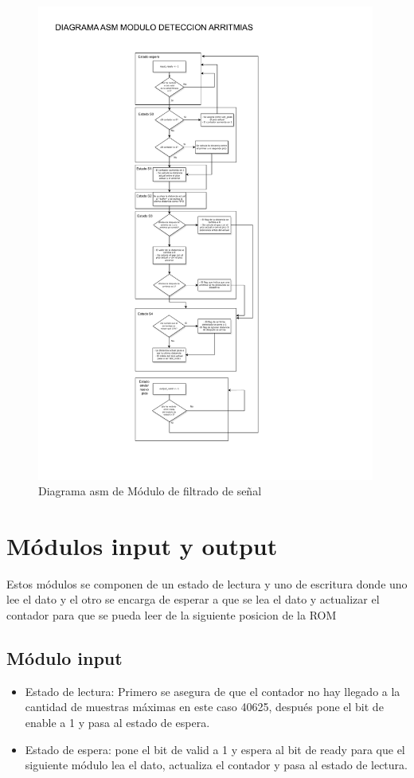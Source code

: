 \begin{figure}[h!]
    \centering
    \includegraphics[width=0.99\textwidth]{./Images/img_implementacion_hw/Diagramaasmarritmias.pdf}
    \caption{Diagrama asm de Módulo de filtrado de señal}
    \label{fig:Diagramaasmarritmias}
\end{figure} 

\section {Módulos input y output}
Estos módulos se componen de un estado de lectura y uno de escritura donde uno lee el dato y el otro se encarga de esperar a que se lea el dato y actualizar 
el contador para que se pueda leer de la siguiente posicion de la ROM

\subsection{Módulo input}
\begin{itemize}
    \item Estado de lectura: Primero se asegura de que el contador no hay llegado a la cantidad de muestras máximas en este caso 40625, después pone el bit de enable a 1 
    y pasa al estado de espera.
    \item Estado de espera: pone el bit de valid a 1 y espera al bit de ready para que el siguiente módulo lea el dato, actualiza el contador y pasa al estado de lectura.
\end{itemize}

